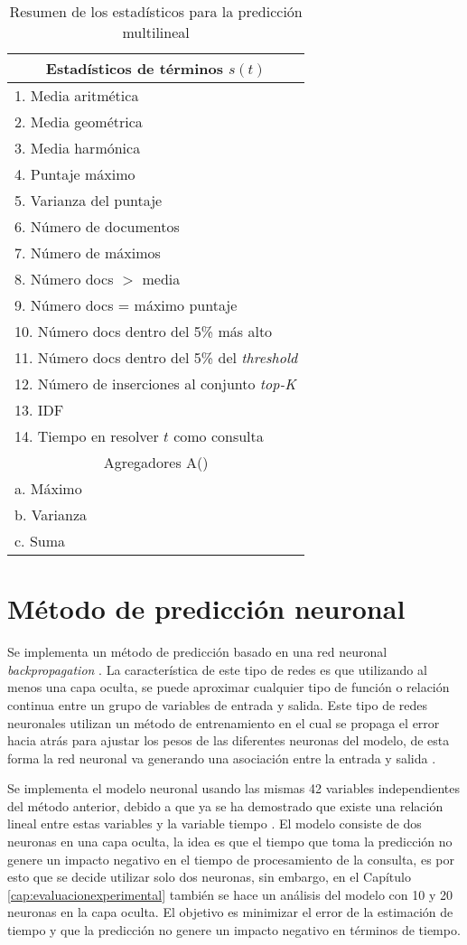 \begin{table}[!ht]
\centering
\caption{Resumen de los estadísticos para la predicción multilineal}
\begin{tabular}{|l|}
\hline
\multicolumn{1}{|c|}{Estadísticos de términos $s(t)$} \\ \hline
1. Media aritmética \\ 
2. Media geométrica \\ 
3. Media harmónica \\ 
4. Puntaje máximo \\ 
5. Varianza del puntaje \\ 
6. Número de documentos \\ 
7. Número de máximos \\ 
8. Número docs $>$ media \\ 
9. Número docs = máximo puntaje \\ 
10. Número docs dentro del 5\% más alto \\
11. Número docs dentro del 5\% del \textit{threshold} \\ 
12. Número de inserciones al conjunto \textit{top-K} \\ 
13. IDF \\ 
14. Tiempo en resolver $t$ como consulta \\ \hline
\multicolumn{1}{|c|}{Agregadores A()} \\ \hline
a. Máximo \\ 
b. Varianza  \\ 
c. Suma \\ \hline
\end{tabular}
\label{tabla:estadisticosGlasgow}
\end{table}

\section{Método de predicción neuronal}
\label{scheduling:neuronal}
Se implementa un método de predicción basado en una red neuronal \textit{backpropagation} \citep{Rumelhart:1988}. La característica de este tipo de redes es que utilizando al menos una capa oculta, se puede aproximar cualquier tipo de función o relación continua entre un grupo de variables de entrada y salida. Este tipo de redes neuronales utilizan un método de entrenamiento en el cual se propaga el error hacia atrás para ajustar los pesos de las diferentes neuronas del modelo, de esta forma la red neuronal va generando una asociación entre la entrada y salida \citep{Fausett:1994}.

Se implementa el modelo neuronal usando las mismas 42 variables independientes del método anterior, debido a que ya se ha demostrado que existe una relación lineal entre estas variables y la variable tiempo \citep{Macdonald:2012, Hauff:2010, He:2004}. El modelo consiste de dos neuronas en una capa oculta, la idea es que el tiempo que toma la predicción no genere un impacto negativo en el tiempo de procesamiento de la consulta, es por esto que se decide utilizar solo dos neuronas, sin embargo, en el Capítulo \ref{cap:evaluacionexperimental} también se hace un análisis del modelo con 10 y 20 neuronas en la capa oculta. El objetivo es minimizar el error de la estimación de tiempo y que la predicción no genere un impacto negativo en términos de tiempo.